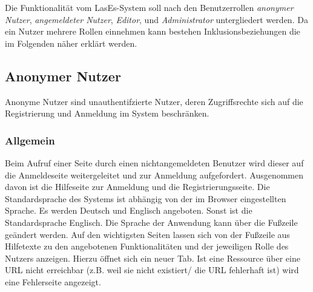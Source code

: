 Die Funktionalität vom LasEs-System soll nach den Benutzerrollen
\textit{anonymer Nutzer}, \textit{angemeldeter Nutzer}, \textit{Editor}, und
\textit{Administrator} untergliedert werden. Da ein Nutzer mehrere Rollen einnehmen
kann bestehen Inklusionsbeziehungen die im Folgenden näher erklärt werden.

\subsection{Anonymer Nutzer}
Anonyme Nutzer sind unauthentifzierte Nutzer, deren Zugriffsrechte sich
auf die Registrierung und Anmeldung im System beschränken.

\subsubsection{Allgemein}
\begin{description}
     Beim Aufruf einer Seite durch einen nichtangemeldeten Benutzer
    wird dieser auf die Anmeldeseite weitergeleitet und zur
    Anmeldung aufgefordert. Ausgenommen davon ist die Hilfeseite zur Anmeldung und die
    Registrierungsseite.
     Die Standardsprache des Systems ist abhängig von der im Browser
    eingestellten Sprache. Es werden Deutsch und Englisch angeboten.
    Sonst ist die Standardsprache Englisch. Die Sprache der Anwendung kann über die
    Fußzeile geändert werden.
     Auf den wichtigsten Seiten lassen sich von der Fußzeile aus
    Hilfetexte zu den angebotenen Funktionalitäten und der jeweiligen Rolle
    des Nutzers anzeigen. Hierzu öffnet sich ein neuer Tab.
    \XXitem{} Ist eine Ressource über eine URL nicht erreichbar (z.B. weil sie nicht existiert/
     die URL fehlerhaft ist) wird eine Fehlerseite angezeigt.%
\end{description}

